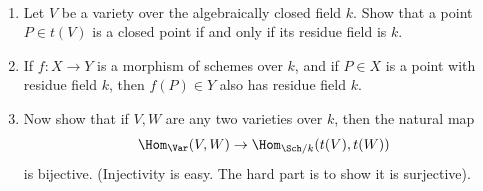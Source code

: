 \begin{exercise}%
	~
	\begin{enumerate}
		\item Let $V $ be a variety over the algebraically closed field $k $. Show that a point $P \in t(V) $ is a closed point if and only if its residue field is $k $.
		\item If $f: X\to Y $ is a morphism of schemes over $k $, and if $P \in X $ is a point with residue field $k $, then $f(P) \in Y $ also has residue field $k $.
		\item Now show that if $V,W $ are any two varieties over $k $, then the natural map
			\[
				\Hom_{\Var}(V,W) \to \Hom_{\Sch / k}(t(V),t(W))
			\]
			is bijective. (Injectivity is easy. The hard part is to show it is surjective).
	\end{enumerate}
\end{exercise}
